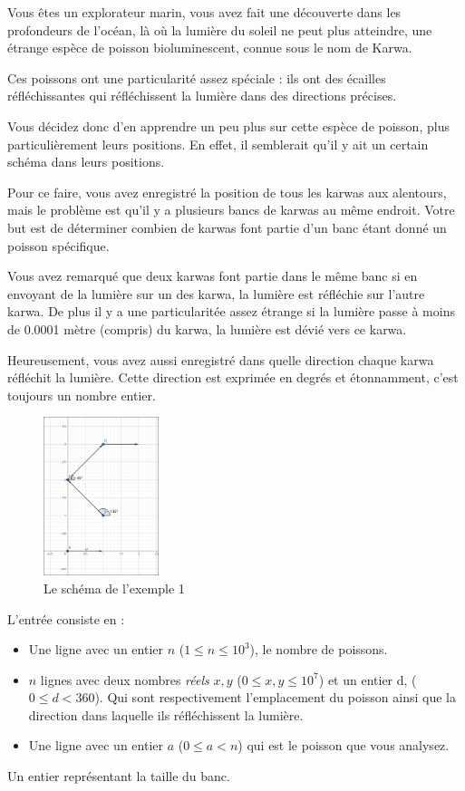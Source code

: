 \problemname{}


Vous êtes un explorateur marin, vous avez fait une découverte dans les profondeurs de l'océan, là où la lumière du soleil ne peut plus atteindre, une étrange espèce de poisson bioluminescent, connue sous le nom de Karwa.

Ces poissons ont une particularité assez spéciale : ils ont des écailles réfléchissantes qui réfléchissent la lumière dans des directions précises.

Vous décidez donc d'en apprendre un peu plus sur cette espèce de poisson, plus particulièrement leurs positions. En effet, il semblerait qu'il y ait un certain schéma dans leurs positions.

Pour ce faire, vous avez enregistré la position de tous les karwas aux alentours, mais le problème est qu'il y a plusieurs bancs de karwas au même endroit. Votre but est de déterminer combien de karwas font partie d'un banc étant donné un poisson spécifique.

Vous avez remarqué que deux karwas font partie dans le même banc si en envoyant de la lumière sur un des karwa, la lumière est réfléchie sur l'autre karwa. De plus il y a une particularitée assez étrange si la lumière passe à moins de 0.0001 mètre (compris) du karwa, la lumière est dévié vers ce karwa.

Heureusement, vous avez aussi enregistré dans quelle direction chaque karwa réfléchit la lumière. Cette direction est exprimée en degrés et étonnamment, c'est toujours un nombre entier.


\smallskip
\begin{figure}[h]
    \centering
    \includegraphics[width=0.3\textwidth]{sample1.png}
    \caption{Le schéma de l'exemple 1}
\end{figure}

\begin{Input}
    L'entrée consiste en :
    \begin{itemize}
        \item Une ligne avec un entier $n$ ($1 \leq n \leq 10^{3}$), le nombre de poissons.
        \item $n$ lignes avec deux nombres \emph{réels} $x, y$ ($0 \leq x,y \leq {10^{7}}$) et un entier d, ($0 \leq d < 360$). Qui sont respectivement l'emplacement du poisson ainsi que la direction dans laquelle ils réfléchissent la lumière.
        \item Une ligne avec un entier $a$ ($0 \leq a < n$) qui est le poisson que vous analysez.
    \end{itemize}
\end{Input}

\begin{Output}
    Un entier représentant la taille du banc.
\end{Output}
